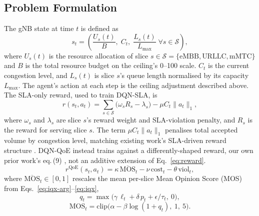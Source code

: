 \documentclass[10pt]{article}
\begin{document}
\subsection{Problem Formulation}
\label{sec:problem-formulation}
The gNB state at time $t$ is defined as
\begin{equation}
s_t = \left(\frac{U_s(t)}{B}, \; C_t, \; \frac{L_s(t)}{L_{\max}} \;\forall s \in \mathcal{S}\right),
\label{eq:state}
\end{equation}
where $U_s(t)$ is the resource allocation of slice $s \in
\mathcal{S}=\{\text{eMBB},\text{URLLC},\text{mMTC}\}$ and $B$ is the
total resource budget on the ceiling's 0--100 scale. $C_t$ is the
current congestion level, and $L_s(t)$ is slice $s$'s queue length
normalised by its capacity $L_{\max}$. The agent's action at each
step is the ceiling adjustment described above. The SLA-only reward,
used to train DQN-SLA, is
\begin{equation}
r(s_t,a_t) = \sum_{s\in\mathcal{S}}\big(\omega_s R_s - \lambda_s\big) - \mu C_t\|a_t\|_1,
\label{eq:reward}
\end{equation}
where $\omega_s$ and $\lambda_s$ are slice $s$'s reward weight and
SLA-violation penalty, and $R_s$ is the reward for serving slice $s$.
The term $\mu C_t\|a_t\|_1$ penalises total accepted volume by
congestion level, matching existing work's SLA-driven reward
structure \cite{mecon-paper1,icraie-paper2}. DQN-QoE instead trains
against a differently-shaped reward, our own prior work's eq.\,(9)
\cite{survey-paper3}, not an additive extension of Eq.~\eqref{eq:reward}.
{\setlength{\abovedisplayskip}{5pt plus 1pt minus 1pt}%
\setlength{\belowdisplayskip}{5pt plus 1pt minus 1pt}%
\setlength{\abovedisplayshortskip}{3pt plus 1pt minus 1pt}%
\setlength{\belowdisplayshortskip}{3pt plus 1pt minus 1pt}%
\begin{equation}
r^{\mathrm{QoE}}(s_t,a_t) = \kappa\,\overline{\mathrm{MOS}}_t - \nu\,\mathrm{cost}_t - \theta\,\mathrm{viol}_t,
\label{eq:qoe-reward}
\end{equation}
where $\overline{\mathrm{MOS}}_t\in[0,1]$ rescales the mean per-slice
Mean Opinion Score (MOS) from Eqs.~\eqref{eq:iqx-arg}--\eqref{eq:iqx},
\begin{equation}
q_t = \max\big(\gamma\,\ell_t + \delta\,p_t + \epsilon/\tau_t,\ 0\big),
\label{eq:iqx-arg}
\end{equation}
\begin{equation}
\mathrm{MOS}_t = \mathrm{clip}\big(\alpha - \beta\log(1+q_t),\ 1,\ 5\big).
\label{eq:iqx}
\end{equation}}
\end{document}
